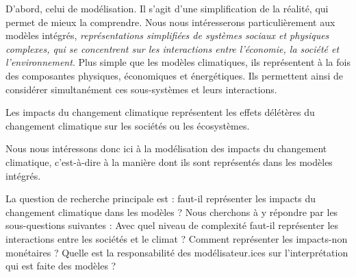 
D'abord, celui de modélisation. Il s'agit d'une simplification de la réalité, qui permet de mieux la comprendre. Nous nous intéresserons particulièrement aux modèles intégrés, \textit{représentations simplifiées de systèmes sociaux et physiques complexes, qui se concentrent sur les interactions entre l'économie, la société et l'environnement}. Plus simple que les modèles climatiques, ils représentent à la fois des composantes physiques, économiques et énergétiques. Ils permettent ainsi de considérer simultanément ces sous-systèmes et leurs interactions. 


Les impacts du changement climatique représentent les effets délétères du changement climatique sur les sociétés ou les écosystèmes. 





Nous nous intéressons donc ici à la modélisation des impacts du changement climatique, c'est-à-dire à la manière dont ils sont représentés dans les modèles intégrés. 


La question de recherche principale est : faut-il représenter les impacts du changement climatique dans les modèles ? Nous cherchons à y répondre par les sous-questions suivantes : Avec quel niveau de complexité faut-il représenter les interactions entre les sociétés et le climat ? Comment représenter les impacts-non monétaires ? Quelle est la responsabilité des modélisateur.ices sur l'interprétation qui est faite des modèles ? 


